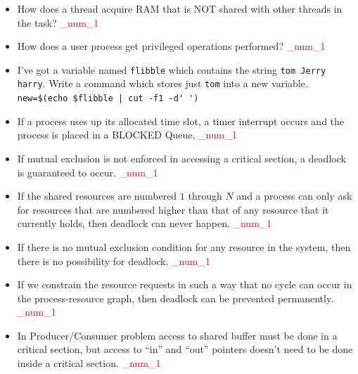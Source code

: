 \documentclass[9pt,landscape]{memoir}
\newcommand{\answer}[1]{\textcolor{red}{_num_1}}
\begin{document}
\begin{multicols}{6}
\begin{itemize}
    \item How does a thread acquire RAM that is NOT shared with other threads in the task? \answer{Define local variables and use them only in this thread scope.}
    \item How does a user process get privileged operations performed? \answer{The hardware allows privileged instructions to be executed only in supervisor mode. If an attempt is made to execute a privileged instruction in user mode, the hardware does not execute the instruction, but rather treats the instruction as illegal and traps to the OS and automatically switches to supervisor mode. When a user program does a system call, the switch to the supervisor mode is done automatically by the OS and the priviledged instructions that are needed by the system routine can be executed. Since the OS code is trusted, there is no harm done by giving access to privilidged instructions this way.}
    \item I've got a variable named \verb$flibble$ which contains the string \verb$tom Jerry harry$. Write a command which stores just \verb$tom$ into a new variable. \verb|new=$(echo $flibble|\verb$ | cut -f1 -d' ')$
    \item If a process uses up its allocated time slot, a timer interrupt occurs and the process is placed in a BLOCKED Queue.  \answer{False. It is placed in the READY queue.}
    \item If mutual exclusion is not enforced in accessing a critical section, a deadlock is guaranteed to occur. \answer{False.}
    \item If the shared resources are numbered $1$ through $N$ and a process can only ask for resources that are numbered higher than that of any resource that it currently holds, then deadlock can never happen. \answer{True.}
    \item If there is no mutual exclusion condition for any resource in the system, then there is no possibility for deadlock. \answer{True.}
    \item If we constrain the resource requests in such a way that no cycle can occur in the process-resource graph, then deadlock can be prevented permanently. \answer{True.}
    \item In Producer/Consumer problem access to shared buffer must be done in a critical section, but access to ``in'' and ``out'' pointers doesn't need to be done inside a critical section.  \answer{False. ``in'' and ``out'' are shared variables. They need to be accessed inside a critical section.}

\end{itemize}
\end{multicols}
\end{document}
